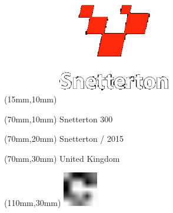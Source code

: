 \null\newpage
\begin{textblock*}{50mm}(15mm,10mm)%
\includegraphics[width=50mm]{LG/SNE.png}
\end{textblock*}
\begin{textblock*}{130mm}(70mm,10mm)%
{\fontsize{20}{20}\selectfont Snetterton 300}\\
\end{textblock*}
\begin{textblock*}{120mm}(70mm,20mm)%
{\fontsize{16}{16}\selectfont Snetterton / 2015}\\
\end{textblock*}
\begin{textblock*}{120mm}(70mm,30mm)%
{\fontsize{12}{12}\selectfont United Kingdom}
\end{textblock*}
\begin{textblock*}{30mm}(110mm,30mm)%
\centering
\includegraphics[height=15mm]{icons/fa-rotate-right.pdf}
\end{textblock*}
